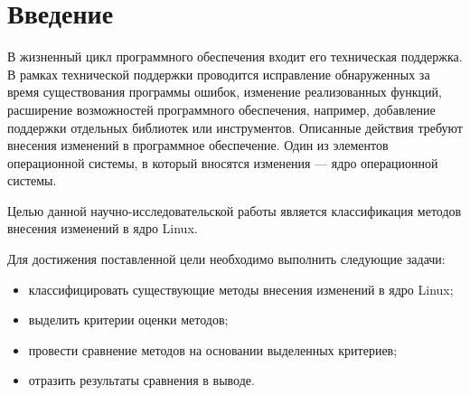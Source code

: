 \chapter*{Введение}

В жизненный цикл программного обеспечения входит его техническая поддержка. В рамках технической поддержки проводится  исправление обнаруженных за время существования программы ошибок, изменение реализованных функций, расширение возможностей программного обеспечения, например, добавление поддержки отдельных библиотек или инструментов. Описанные действия требуют внесения изменений в программное обеспечение. Один из элементов операционной системы, в который вносятся изменения --- ядро операционной системы.

Целью данной научно-исследовательской работы является классификация методов внесения изменений в ядро Linux.

Для достижения поставленной цели необходимо выполнить следующие задачи:

\begin{itemize}
	\item классифицировать существующие методы внесения изменений в ядро Linux;
	\item выделить критерии оценки методов;
	\item провести сравнение методов на основании выделенных критериев;
	\item отразить результаты сравнения в выводе.
\end{itemize}